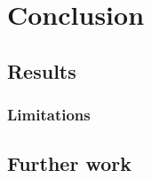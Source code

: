 \chapter{Conclusion}
\label{chap:conclusion}


\section{Results}

\subsection{Limitations}

\section{Further work}

